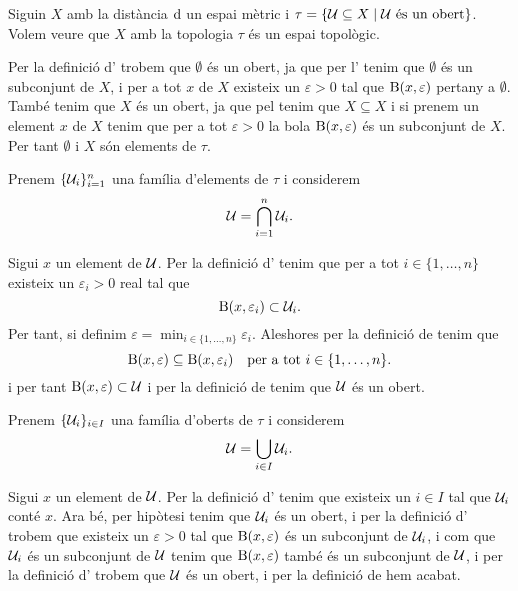 \documentclass[../Apunts.tex]{subfiles}
\begin{document}
	\begin{example}
		\label{ex:topologia induida per una mètrica}
		Siguin \(X\) amb la distància \(\operatorname{d}\) un espai mètric i \(\tau=\{\mathcal{U}\subseteq X\mid \mathcal{U}\text{ és un obert}\}\). Volem veure que \(X\) amb la topologia \(\tau\) és un espai topològic.
		\begin{solution}
			Per la definició d' trobem que \(\emptyset\) és un obert, ja que per l' tenim que \(\emptyset\) és un subconjunt de \(X\), i per a tot \(x\) de \(X\) existeix un \(\varepsilon>0\) tal que \(\operatorname{B}(x,\varepsilon)\) pertany a \(\emptyset\). També tenim que \(X\) és un obert, ja que pel  tenim que \(X\subseteq X\) i si prenem un element \(x\) de \(X\) tenim que per a tot \(\varepsilon>0\) la bola \(\operatorname{B}(x,\varepsilon)\) és un subconjunt de \(X\). Per tant \(\emptyset\) i \(X\) són elements de \(\tau\).
			
			Prenem \(\{\mathcal{U}_{i}\}_{i=1}^{n}\) una família d'elements de \(\tau\) i considerem
			\[\mathcal{U}=\bigcap_{i=1}^{n}\mathcal{U}_{i}.\]
			
			Sigui \(x\) un element de \(\mathcal{U}\). Per la definició d' tenim que per a tot \(i\in\{1,\dots,n\}\) existeix un \(\varepsilon_{i}>0\) real tal que
			\[\operatorname{B}(x,\varepsilon_{i})\subset\mathcal{U}_{i}.\]
			Per tant, si definim \(\varepsilon=\min_{i\in\{1,\dots,n\}}\varepsilon_{i}\). Aleshores per la definició de  tenim que
			\[\operatorname{B}(x,\varepsilon)\subseteq\operatorname{B}(x,\varepsilon_{i})\quad\text{per a tot }i\in\{1,\dots,n\}.\]
			i per tant \(\operatorname{B}(x,\varepsilon)\subset\mathcal{U}\) i per la definició de  tenim que \(\mathcal{U}\) és un obert.
			
			Prenem \(\{\mathcal{U}_{i}\}_{i\in I}\) una família d'oberts de \(\tau\) i considerem
			\[\mathcal{U}=\bigcup_{i\in I}\mathcal{U}_{i}.\]
			
			Sigui \(x\) un element de \(\mathcal{U}\). Per la definició d' tenim que existeix un \(i\in I\) tal que \(\mathcal{U}_{i}\) conté \(x\). Ara bé, per hipòtesi tenim que \(\mathcal{U}_{i}\) és un obert, i per la definició d' trobem que existeix un \(\varepsilon>0\) tal que \(\operatorname{B}(x,\varepsilon)\) és un subconjunt de \(\mathcal{U}_{i}\), i com que \(\mathcal{U}_{i}\) és un subconjunt de \(\mathcal{U}\) tenim que \(\operatorname{B}(x,\varepsilon)\) també és un subconjunt de \(\mathcal{U}\), i per la definició d' trobem que \(\mathcal{U}\) és un obert, i per la definició de  hem acabat.
		\end{solution}
	\end{example}
\end{document}
